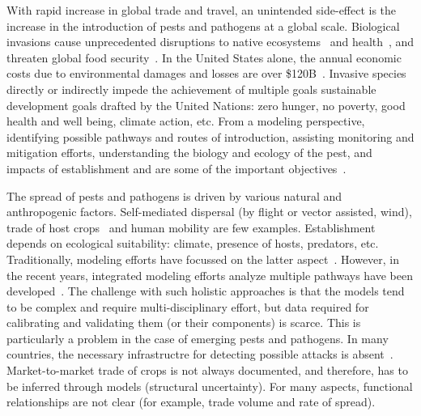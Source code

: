 \documentclass{article}
\begin{document}
With rapid increase in global trade and travel, an unintended side-effect
is the increase in the introduction of pests and pathogens at a global
scale. Biological invasions cause unprecedented disruptions to native
ecosystems~\cite{crowl2008spread} and health~\cite{pyvsek2010invasive}, and
threaten global food security~\cite{pimentel2001economic}. In the United
States alone, the annual economic costs due to environmental damages and
losses are over \$120B~\cite{pimentel2005update}. Invasive species directly
or indirectly impede the achievement of multiple goals sustainable
development goals drafted by the United Nations: zero hunger, no poverty,
good health and well being, climate action, etc.
From a modeling perspective, identifying possible pathways and routes of
introduction, assisting monitoring and mitigation efforts, understanding
the biology and ecology of the pest, and impacts of establishment and are
some of the important objectives~\cite{venette2010,cunniffe2015thirteen}.

The spread of pests and pathogens is driven by various natural and
anthropogenic factors.  Self-mediated dispersal (by flight or vector
assisted, wind), trade of host crops~\cite{hulme2009trade} and human
mobility are few examples.  Establishment depends on ecological
suitability: climate, presence of hosts, predators, etc. Traditionally,
modeling efforts have focussed on the latter
aspect~\cite{sutherst2000climate}. However, in the recent years, integrated
modeling efforts analyze multiple pathways have been
developed~\cite{soliman2012framework,carrasco2010unveiling}.
The challenge with such holistic approaches is that the models tend to be
complex and require multi-disciplinary effort, but data required for
calibrating and validating them (or their components) is scarce. This is
particularly a problem in the case of emerging pests and pathogens. In many
countries, the necessary infrastructre for detecting possible attacks is
absent~\cite{early2016global}. Market-to-market trade of crops is not
always documented, and therefore, has to be inferred through models
(structural uncertainty). For many aspects, functional relationships are
not clear (for example, trade volume and rate of spread).  
\end{document}
